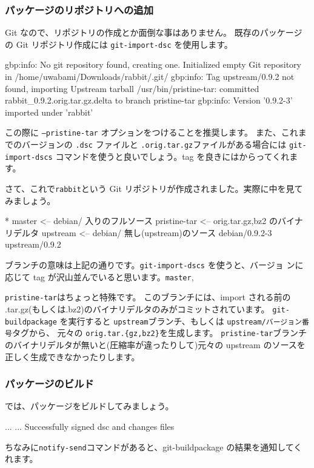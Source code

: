 \documentclass[mingoth,a4paper]{jsarticle}
\begin{document}
\subsubsection{パッケージのリポジトリへの追加}

Git なので、リポジトリの作成とか面倒な事はありません。
既存のパッケージの Git リポジトリ作成には {\tt{git-import-dsc}} を使用します。
\begin{commandline}
  gbp:info: No git repository found, creating one.
  Initialized empty Git repository in /home/uwabami/Downloads/rabbit/.git/
  gbp:info: Tag upstream/0.9.2 not found, importing Upstream tarball
  /usr/bin/pristine-tar: committed rabbit_0.9.2.orig.tar.gz.delta to branch pristine-tar
  gbp:info: Version '0.9.2-3' imported under 'rabbit'
\end{commandline}
この際に {\tt{--pristine-tar}} オプションをつけることを推奨します。
また、これまでのバージョンの {\tt{.dsc}} ファイルと {\tt{.orig.tar.gz}}ファイルがある場合には
{\tt{git-import-dscs}} コマンドを使うと良いでしょう。tag を良きにはからってくれます。

さて、これで{\tt{rabbit}}という Git リポジトリが作成されました。実際に中を見てみましょう。
\begin{commandline}
  * master                    <-- debian/ 入りのフルソース
    pristine-tar              <-- orig.tar.{gz,bz2} のバイナリデルタ
    upstream                  <-- debian/ 無し(upstream)のソース
  debian/0.9.2-3
  upstream/0.9.2
\end{commandline}
ブランチの意味は上記の通りです。{\tt{git-import-dscs}} を使うと、バージョ
ンに応じて tag が沢山並んでいると思います。{\tt{master}},

{\tt{pristine-tar}}はちょっと特殊です。
このブランチには、import される前の .tar.gz(もしくは.bz2)のバイナリデルタのみがコミットされています。
{\tt{git-buildpackage}} を実行すると {\tt{upstream}}ブランチ、もしくは {\tt{upstream/バージョン番号}}タグから、
元々の {\tt{orig.tar.\{gz,bz2\}}}を生成します。
{\tt{pristine-tar}}ブランチのバイナリデルタが無いと(圧縮率が違ったりして)元々の upstream のソースを正しく生成できなかったりします。

\subsubsection{パッケージのビルド}
では、パッケージをビルドしてみましょう。
\begin{commandline}
  ...
  ...
  Successfully signed dsc and changes files
\end{commandline}
ちなみに{\tt{notify-send}}コマンドがあると、git-buildpackage の結果を通知してくれます。
\end{document}
